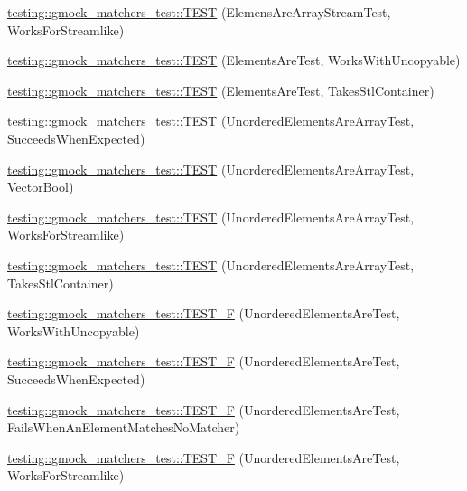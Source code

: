 \begin{DoxyCompactItemize}
\item 
\hyperlink{namespacetesting_1_1gmock__matchers__test_a5cc317a80c3501cb7f53d07043b7270c}{testing\+::gmock\+\_\+matchers\+\_\+test\+::\+T\+E\+ST} (Elemens\+Are\+Array\+Stream\+Test, Works\+For\+Streamlike)
\item 
\hyperlink{namespacetesting_1_1gmock__matchers__test_ab403dce87c2d198a4f709d7f781d03c6}{testing\+::gmock\+\_\+matchers\+\_\+test\+::\+T\+E\+ST} (Elements\+Are\+Test, Works\+With\+Uncopyable)
\item 
\hyperlink{namespacetesting_1_1gmock__matchers__test_a290280b9e89a57833c9fc706d153b98a}{testing\+::gmock\+\_\+matchers\+\_\+test\+::\+T\+E\+ST} (Elements\+Are\+Test, Takes\+Stl\+Container)
\item 
\hyperlink{namespacetesting_1_1gmock__matchers__test_adb7e47654f1536fc049243f765292825}{testing\+::gmock\+\_\+matchers\+\_\+test\+::\+T\+E\+ST} (Unordered\+Elements\+Are\+Array\+Test, Succeeds\+When\+Expected)
\item 
\hyperlink{namespacetesting_1_1gmock__matchers__test_a3d7df4fa0dd3e8247f4c2d4b02d801f0}{testing\+::gmock\+\_\+matchers\+\_\+test\+::\+T\+E\+ST} (Unordered\+Elements\+Are\+Array\+Test, Vector\+Bool)
\item 
\hyperlink{namespacetesting_1_1gmock__matchers__test_a1ff2a93a8f031a5b23dbc699a462043b}{testing\+::gmock\+\_\+matchers\+\_\+test\+::\+T\+E\+ST} (Unordered\+Elements\+Are\+Array\+Test, Works\+For\+Streamlike)
\item 
\hyperlink{namespacetesting_1_1gmock__matchers__test_aa3a960ec78e2b1e860c305f4598f39ec}{testing\+::gmock\+\_\+matchers\+\_\+test\+::\+T\+E\+ST} (Unordered\+Elements\+Are\+Array\+Test, Takes\+Stl\+Container)
\item 
\hyperlink{namespacetesting_1_1gmock__matchers__test_ab09132c3b991b8f104f3091370d2fe55}{testing\+::gmock\+\_\+matchers\+\_\+test\+::\+T\+E\+S\+T\+\_\+F} (Unordered\+Elements\+Are\+Test, Works\+With\+Uncopyable)
\item 
\hyperlink{namespacetesting_1_1gmock__matchers__test_a177c3db59da001df2441deb1ddb083af}{testing\+::gmock\+\_\+matchers\+\_\+test\+::\+T\+E\+S\+T\+\_\+F} (Unordered\+Elements\+Are\+Test, Succeeds\+When\+Expected)
\item 
\hyperlink{namespacetesting_1_1gmock__matchers__test_a62fd481b1160a667c785e6009ff87163}{testing\+::gmock\+\_\+matchers\+\_\+test\+::\+T\+E\+S\+T\+\_\+F} (Unordered\+Elements\+Are\+Test, Fails\+When\+An\+Element\+Matches\+No\+Matcher)
\item 
\hyperlink{namespacetesting_1_1gmock__matchers__test_a2affca2a152e4537c2f06518eaa2eac5}{testing\+::gmock\+\_\+matchers\+\_\+test\+::\+T\+E\+S\+T\+\_\+F} (Unordered\+Elements\+Are\+Test, Works\+For\+Streamlike)

\end{DoxyCompactItemize}
